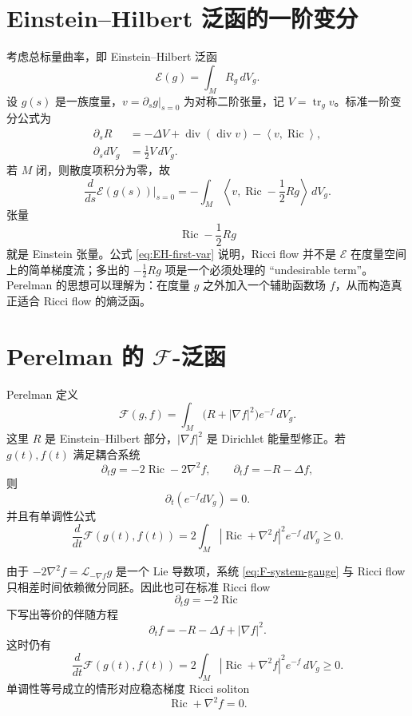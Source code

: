 \documentclass[11pt,a4paper,cn,nofont,math=cm,mode=fancy,bibtex]{elegantbook}
\numberwithin{equation}{chapter}
\numberwithin{figure}{chapter}
\newcommand{\Ric}{\operatorname{Ric}}
\newcommand{\tr}{\operatorname{tr}}
\newcommand{\divg}{\operatorname{div}}
\newcommand{\norm}[1]{\left\lvert #1\right\rvert}
\newcommand{\inner}[2]{\left\langle #1,#2\right\rangle}
\begin{document}
\section{Einstein--Hilbert 泛函的一阶变分}

考虑总标量曲率，即 Einstein--Hilbert 泛函
\begin{equation}\label{eq:EH-action}
  \mathcal E(g)=\int_M R_g\,dV_g .
\end{equation}
设 $g(s)$ 是一族度量，$v=\partial_sg|_{s=0}$ 为对称二阶张量，记 $V=\tr_g v$。标准一阶变分公式为
\begin{align}
  \partial_s R
  &= -\Delta V+\divg(\divg v)-\inner{v}{\Ric},\label{eq:scalar-first-var}\\
  \partial_s dV_g
  &=\frac12 V\,dV_g.\label{eq:volume-first-var}
\end{align}
若 $M$ 闭，则散度项积分为零，故
\begin{equation}\label{eq:EH-first-var}
  \frac{d}{ds}\mathcal E(g(s))\bigg|_{s=0}
  =-\int_M\inner{v}{\Ric-\frac12 Rg}\,dV_g .
\end{equation}
张量
\[
  \Ric-\frac12 Rg
\]
就是 Einstein 张量。公式 \eqref{eq:EH-first-var} 说明，Ricci flow 并不是 $\mathcal E$ 在度量空间上的简单梯度流；多出的 $-\frac12Rg$ 项是一个必须处理的 ``undesirable term''。Perelman 的思想可以理解为：在度量 $g$ 之外加入一个辅助函数场 $f$，从而构造真正适合 Ricci flow 的熵泛函。

\section{Perelman 的 $\mathcal F$-泛函}

Perelman 定义~\cite{Perelman2002}
\begin{equation}\label{eq:F-functional}
  \mathcal F(g,f)=\int_M \bigl(R+\norm{\nabla f}^2\bigr)e^{-f}\,dV_g .
\end{equation}
这里 $R$ 是 Einstein--Hilbert 部分，$\norm{\nabla f}^2$ 是 Dirichlet 能量型修正。若 $g(t),f(t)$ 满足耦合系统
\begin{equation}\label{eq:F-system-gauge}
  \partial_tg=-2\Ric-2\nabla^2f,
  \qquad
  \partial_tf=-R-\Delta f,
\end{equation}
则
\[
  \partial_t(e^{-f}dV_g)=0.
\]
并且有单调性公式
\begin{equation}\label{eq:F-monotonicity-gauge}
  \frac{d}{dt}\mathcal F(g(t),f(t))
  =2\int_M\norm{\Ric+\nabla^2f}^2e^{-f}\,dV_g\ge0 .
\end{equation}

由于 $-2\nabla^2f=\mathcal L_{-\nabla f}g$ 是一个 Lie 导数项，系统 \eqref{eq:F-system-gauge} 与 Ricci flow 只相差时间依赖微分同胚。因此也可在标准 Ricci flow
\[
  \partial_tg=-2\Ric
\]
下写出等价的伴随方程
\begin{equation}\label{eq:F-conjugate-f}
  \partial_tf=-R-\Delta f+\norm{\nabla f}^2 .
\end{equation}
这时仍有
\begin{equation}\label{eq:F-monotonicity}
  \frac{d}{dt}\mathcal F(g(t),f(t))
  =2\int_M\norm{\Ric+\nabla^2f}^2e^{-f}\,dV_g\ge0 .
\end{equation}
单调性等号成立的情形对应稳态梯度 Ricci soliton
\[
  \Ric+\nabla^2f=0.
\]
\end{document}
